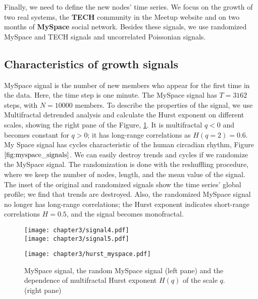 Finally, we need to define the new nodes' time series. We focus on the growth of two real systems, the \textbf{TECH} \cite{smiljanic2017associative} community in the Meetup website and on two months of \textbf{MySpace} \cite{suvakov2013} social network. Besides these signals, we use randomized MySpace and TECH signals and uncorrelated Poissonian signals.    %

\subsection{Characteristics of growth signals} %

MySpace signal is the number of new members who appear for the first time in the data. Here, the time step is one minute. The MySpace signal has $T = 3162$ steps, with  $N = 10000$ members. To describe the properties of the signal, we use Multifractal detrended analysis and calculate the Hurst exponent on different scales, showing the right pane of the Figure, \ref{fig:myspace_signals}. It is multifractal $q<0$ and becomes constant for $q>0$; it has long-range correlations as $H(q=2)=0.6$. My Space signal has cycles characteristic of the human circadian rhythm, Figure $\ref{fig:myspace_signals}$. We can easily destroy trends and cycles if we randomize the MySpace signal. The randomization is done with the reshuffling procedure, where we keep the number of nodes, length, and the mean value of the signal. The inset of the original and randomized signals show the time series' global profile; we find that trends are destroyed. Also, the randomized MySpace signal no longer has long-range correlations; the Hurst exponent indicates short-range correlations $H=0.5$, and the signal becomes monofractal.    


\begin{figure}[H]
	\centering
	\begin{minipage}[b]{0.4\textwidth}
		\centering
		\texttt{[image: chapter3/signal4.pdf]}\\
		\texttt{[image: chapter3/signal5.pdf]}
	\end{minipage}
	\begin{minipage}[b]{0.45\textwidth}
		\centering
		\texttt{[image: chapter3/hurst\_myspace.pdf]}
		\vspace{0.01cm}
	\end{minipage}
	\caption[Properties of MySpace signal.]{MySpace signal, the random MySpace signal (left pane) and the dependence of multifractal Hurst exponent $H(q)$ of the scale $q$. (right pane)}
	\label{fig:myspace_signals}
\end{figure}

